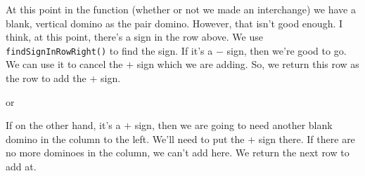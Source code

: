 \documentclass[12pt]{article}
\numberwithin{equation}{section}
\newcommand{\horizontalDominoMaybe}[3]{\filldraw [dominoMaybeStyle] (#2 - 1 + \eps, #1 - 1 + \eps) rectangle + (2 - \teps, 1 -\teps) node [dominoText] {$#3$};}
\newcommand{\verticalDominoMaybeShift}[4]{\filldraw [dominoMaybeStyle] (#2 - 1 + #4 + \eps,  #1 - 1 + \eps) rectangle + (1 - \teps,2 -\teps) node [dominoText] {$#3$};}
\newcommand{\greenCircle}[2]{\filldraw[green] (#2 - .5, #1 - .5) circle (.2cm);}
\begin{document}
\begin{itemize}
\begin{itemize}
      At this point in the function (whether or not we made an interchange) we have a blank, vertical domino as the pair domino.
      However, that isn't good enough.
      I think, at this point, there's a sign in the row above.
      We use \texttt{findSignInRowRight()} to find the sign.
      If it's a $-$ sign, then we're good to go.
      We can use it to cancel the $+$ sign which we are adding.
      So, we return this row as the row to add the $+$ sign.
      \begin{figure}[H]
        \centering
      \end{figure}
      or
      \begin{figure}[H]
        \centering
      \end{figure}

      If on the other hand, it's a $+$ sign, then we are going to need another blank domino in the column to the left.
      We'll need to put the $+$ sign there.
      If there are no more dominoes in the column, we can't add here.
      We return the next row to add at.
      \begin{figure}[H]
        \centering
      \end{figure}


\end{itemize}
\end{itemize}
\end{document}
